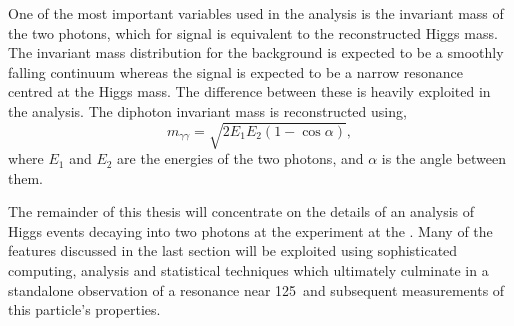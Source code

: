 One of the most important variables used in the analysis is the invariant mass of the two photons, which for signal is equivalent to the reconstructed Higgs mass. The invariant mass distribution for the background is expected to be a smoothly falling continuum whereas the signal is expected to be a narrow resonance centred at the Higgs mass. The difference between these is heavily exploited in the analysis. The diphoton invariant mass is reconstructed using,
\begin{equation}
	m_{\gamma\gamma} = \sqrt{2E_{1}E_{2}(1-\cos\alpha)},
\label{eq:invmass}
\end{equation}
where $E_{1}$ and $E_{2}$ are the energies of the two photons, and $\alpha$ is the angle between them.

The remainder of this thesis will concentrate on the details of an analysis of Higgs events decaying into two photons at the \CMS experiment at the \LHC. Many of the features discussed in the last section will be exploited using sophisticated computing, analysis and statistical techniques which ultimately culminate in a standalone observation of a resonance near 125~\GeV and subsequent measurements of this particle's properties.

